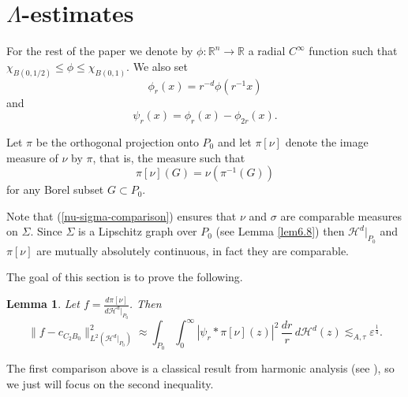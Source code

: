\documentclass[11pt]{amsart}
\newcommand{\R}{{\mathbb R}}       %
\newcommand{\HH}{{\mathcal H}}
\newcommand{\rf}[1]{{(\ref{#1})}}
\newcommand{\ve}{{\varepsilon}}
\newcommand{\vv}{{\vspace{2mm}}}
\newtheorem{lemma}[theorem]{Lemma}
\theoremstyle{definition}
\theoremstyle{remark}
\numberwithin{equation}{section}
\def\lec{\lesssim}
\def\lec{\lesssim}
\newcommand{\jonas}[1]{}%
\begin{document}
\vv
 
\section{$\Lambda$-estimates}


For the rest of the paper we denote by $\phi:\R^n\to\R$ a radial $C^\infty$ function such that $\chi_{B(0,1/2)}\leq\phi\leq 
\chi_{B(0,1)}$.
We also set
\[
\phi_{r}(x) = r^{-d} \phi(r^{-1}x)
\]
and 
\[
\psi_{r}(x) = \phi_{r}(x) -\phi_{2r}(x).\]


Let $\pi$ be the orthogonal projection onto $P_{0}$ and let $\pi[\nu]$ denote the image measure
of $\nu$ by $\pi$, that is, the measure such that
\begin{equation}\label{pi-nu}
\pi[\nu](G)=\nu(\pi^{-1}(G))
\end{equation}
for any Borel subset $G\subset P_0$. 




{%
Note that \rf{nu-sigma-comparison} ensures that $\nu$ and $\sigma$ are comparable measures on $\Sigma$. Since $\Sigma$ is a Lipschitz graph over $P_0$ (see Lemma \ref{lem6.8}) then
$\HH^{d}|_{P_{0}}$ and $\pi[\nu]$ are mutually absolutely continuous, in fact they are comparable.}

The goal of this section is to prove the following. 

 
\begin{lemma}\label{lem8.1}
	Let $f=\frac{d\pi[\nu]}{d\HH^{d}|_{P_{0}}}$. Then
\begin{equation}
\label{e:nu-int}
\|f-c_{C_{2}B_{0}}\|_{L^{2}(\HH^d|_{P_0})}^{2} \approx \int_{P_0}  \int_{0}^{\infty} |\psi_{r}*\pi[\nu](z)|^{2} \,\frac{dr}{r}\, d\HH^d(z) \lec_{A,\tau}  \ve^{\frac{1}{4}}. 
\end{equation}
\end{lemma}

The first comparison above is a classical result from harmonic analysis (see \cite[Section I.6.3]{Big-Stein}), so we just will focus on the second inequality. 
\end{document}
